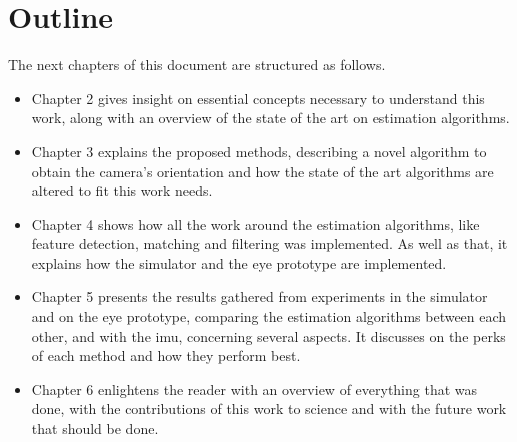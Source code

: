  		
\section{Outline}
\label{cha1:outline}

The next chapters of this document are structured as follows.
\begin{itemize}
\item	Chapter 2 gives insight on essential concepts necessary to understand this work, along with an overview of the state of the art on estimation algorithms.
	
\item	Chapter 3 explains the proposed methods, describing a novel algorithm to obtain the camera's orientation and how the state of the art algorithms are altered to fit this work needs.

\item   Chapter 4 shows how all the work around the estimation algorithms, like feature detection, matching and filtering was implemented. As well as that, it explains how the simulator and the eye prototype are implemented.
	
\item	Chapter 5 presents the results gathered from experiments in the simulator and on the eye prototype, comparing the estimation algorithms between each other, and with the \acrshort{imu}, concerning several aspects. It discusses on the perks of each method and how they perform best.
	
\item	Chapter 6 enlightens the reader with an overview of everything that was done, with the contributions of this work to science and with the future work that should be done.	
\end{itemize}



